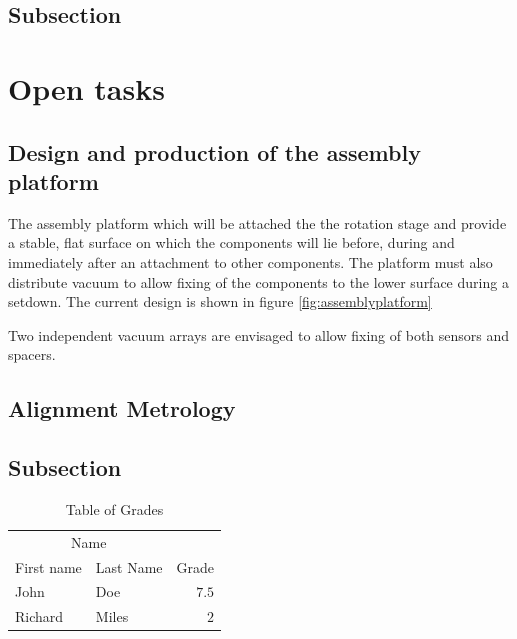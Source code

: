\documentclass[fleqn,10pt]{SelfArx} %
\begin{document}
\subsection{Subsection}

\lipsum[9] %



\section{Open tasks}

\subsection{Design and production of the assembly platform}
The assembly platform which will be attached the the rotation stage and provide a stable, flat surface on which the components will lie before, during and immediately after an attachment to other components. The platform must also distribute vacuum to allow fixing of the components to the lower surface during a setdown. The current design is shown in figure \ref{fig:assemblyplatform}





Two independent vacuum arrays are envisaged to allow fixing of both sensors and spacers.

\subsection{}

\subsection{Alignment Metrology}

\lipsum[10] %

\subsection{Subsection}

\lipsum[11] %

\begin{table}[hbt]
\caption{Table of Grades}
\centering
\begin{tabular}{llr}
\toprule
\multicolumn{2}{c}{Name} \\
\cmidrule(r){1-2}
First name & Last Name & Grade \\
\midrule
John & Doe & $7.5$ \\
Richard & Miles & $2$ \\
\bottomrule
\end{tabular}
\label{tab:label}
\end{table}
\end{document}
